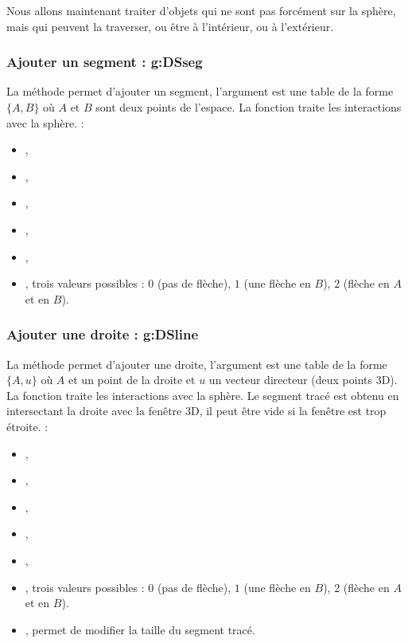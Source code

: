 Nous allons maintenant traiter d'objets qui ne sont pas forcément sur la sphère, mais qui peuvent la traverser, ou être à l'intérieur, ou à l'extérieur.

\subsubsection{ Ajouter un segment : g:DSseg}

La méthode  permet d'ajouter un segment, l'argument  est une table de la forme $\{A,B\}$ où $A$ et $B$ sont deux points de l'espace. La fonction traite les interactions avec la sphère. \writeoptions :
    \begin{itemize}
        \item {}, 
        \item {},
        \item {},
        \item {},
        \item {},
        \item {}, trois valeurs possibles : $0$ (pas de flèche), $1$ (une flèche en $B$), $2$ (flèche en $A$ et en $B$).
    \end{itemize}
    
\subsubsection{Ajouter une droite : g:DSline}

La méthode  permet d'ajouter une droite, l'argument  est une table de la forme $\{A,u\}$ où $A$ et un point de la droite et $u$ un vecteur directeur (deux points 3D). La fonction traite les interactions avec la sphère. Le segment tracé est obtenu en intersectant la droite avec la fenêtre 3D, il peut être vide si la fenêtre est trop étroite. \writeoptions :
    \begin{itemize}
        \item {}, 
        \item {},
        \item {},
        \item {},
        \item {},
        \item {}, trois valeurs possibles : $0$ (pas de flèche), $1$ (une flèche en $B$), $2$ (flèche en $A$ et en $B$).
        \item {}, permet de modifier la taille du segment tracé.
    \end{itemize}
    
